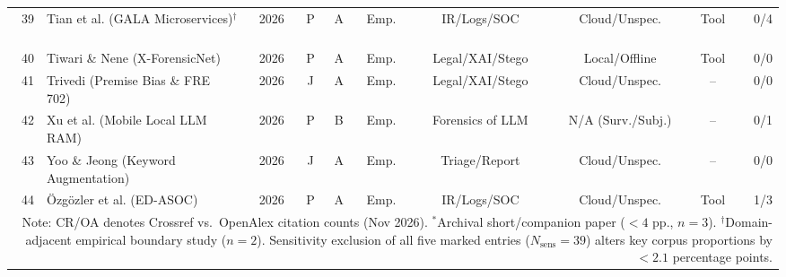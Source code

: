 \begin{table}[!t]
\begin{tabular}{rlcccccccr}
39 & Tian et al. (GALA Microservices)$^\dagger$~\cite{tian2026_gala} & 2026 & P & A & Emp. & IR/Logs/SOC & Cloud/Unspec. & Tool & 0/4 \\
40 & Tiwari \& Nene (X-ForensicNet)~\cite{tiwari2026_xforensicnet} & 2026 & P & A & Emp. & Legal/XAI/Stego & Local/Offline & Tool & 0/0 \\
41 & Trivedi (Premise Bias \& FRE 702)~\cite{trivedi2026_when} & 2026 & J & A & Emp. & Legal/XAI/Stego & Cloud/Unspec. & -- & 0/0 \\
42 & Xu et al. (Mobile Local LLM RAM)~\cite{xu2026_recovering} & 2026 & P & B & Emp. & Forensics of LLM & N/A (Surv./Subj.) & -- & 0/1 \\
43 & Yoo \& Jeong (Keyword Augmentation)~\cite{yoo2026_scpllmscp} & 2026 & J & A & Emp. & Triage/Report & Cloud/Unspec. & -- & 0/0 \\
44 & {\"O}zg{\"o}zler et al. (ED-ASOC)~\cite{zgzler2026_eventdriven} & 2026 & P & A & Emp. & IR/Logs/SOC & Cloud/Unspec. & Tool & 1/3 \\
\bottomrule
\multicolumn{10}{p{17.0cm}}{\tiny Note: CR/OA denotes Crossref vs.\ OpenAlex citation counts (Nov 2026). $^*$Archival short/companion paper ($<4$ pp., $n=3$). $^\dagger$Domain-adjacent empirical boundary study ($n=2$). Sensitivity exclusion of all five marked entries ($N_{\text{sens}}=39$) alters key corpus proportions by $<2.1$ percentage points.}
\end{tabular}
\end{table}
